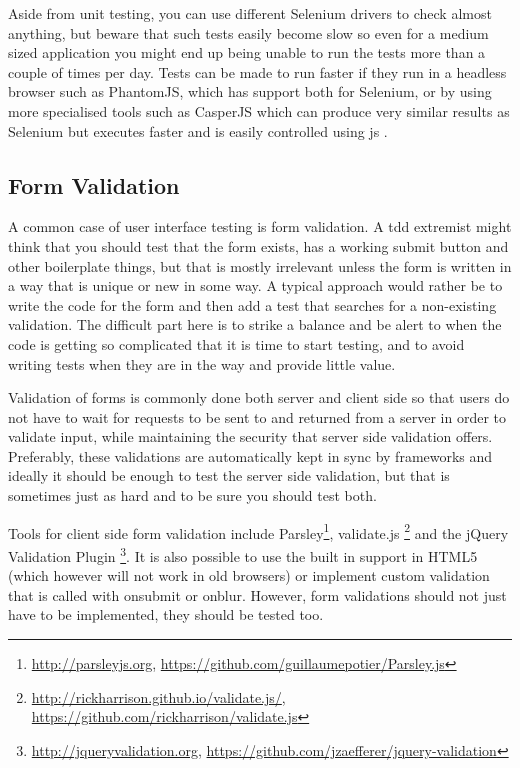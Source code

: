 \documentclass[11pt]{article}
\begin{document}
Aside from unit testing, you can use different Selenium drivers to check almost anything, but beware that such tests easily become slow so even for a medium sized application you might end up being unable to run the tests more than a couple of times per day. Tests can be made to run faster if they run in a headless browser such as PhantomJS, which has support both for Selenium, or by using more specialised tools such as CasperJS which can produce very similar results as Selenium but executes faster and is easily controlled using \gls{js} \cite[p.~142-146]{TestableJS}.

\subsection{Form Validation}

A common case of user interface testing is form validation. A \gls{tdd} extremist might think that you should test that the form exists, has a working submit button and other boilerplate things, but that is mostly irrelevant unless the form is written in a way that is unique or new in some way. A typical approach would rather be to write the code for the form and then add a test that searches for a non-existing validation. The difficult part here is to strike a balance and be alert to when the code is getting so complicated that it is time to start testing, and to avoid writing tests when they are in the way and provide little value. \cite[questions~24-25]{Edelstam}

Validation of forms is commonly done both server and client side so that users do not have to wait for requests to be sent to and returned from a server in order to validate input, while maintaining the security that server side validation offers. Preferably, these validations are automatically kept in sync by frameworks and ideally it should be enough to test the server side validation, but that is sometimes just as hard and to be sure you should test both.

Tools for client side form validation include Parsley\footnote{\url{http://parsleyjs.org}, \url{https://github.com/guillaumepotier/Parsley.js}}, validate.js \footnote{\url{http://rickharrison.github.io/validate.js/}, \url{https://github.com/rickharrison/validate.js}} and the jQuery Validation Plugin \footnote{\url{http://jqueryvalidation.org}, \url{https://github.com/jzaefferer/jquery-validation}}. It is also possible to use the built in support in HTML5 (which however will not work in old browsers) or implement custom validation that is called with onsubmit or onblur. However, form validations should not just have to be implemented, they should be tested too.
\end{document}
